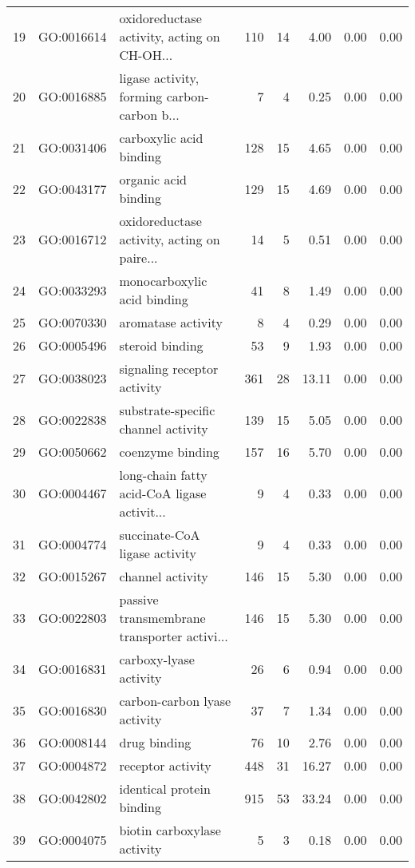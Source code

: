 \begin{table}[ht]
\begin{tabular}{rllrrrrr}
  19 & GO:0016614 & oxidoreductase activity, acting on CH-OH... & 110 &  14 & 4.00 & 0.00 & 0.00 \\ 
  20 & GO:0016885 & ligase activity, forming carbon-carbon b... &   7 &   4 & 0.25 & 0.00 & 0.00 \\ 
  21 & GO:0031406 & carboxylic acid binding & 128 &  15 & 4.65 & 0.00 & 0.00 \\ 
  22 & GO:0043177 & organic acid binding & 129 &  15 & 4.69 & 0.00 & 0.00 \\ 
  23 & GO:0016712 & oxidoreductase activity, acting on paire... &  14 &   5 & 0.51 & 0.00 & 0.00 \\ 
  24 & GO:0033293 & monocarboxylic acid binding &  41 &   8 & 1.49 & 0.00 & 0.00 \\ 
  25 & GO:0070330 & aromatase activity &   8 &   4 & 0.29 & 0.00 & 0.00 \\ 
  26 & GO:0005496 & steroid binding &  53 &   9 & 1.93 & 0.00 & 0.00 \\ 
  27 & GO:0038023 & signaling receptor activity & 361 &  28 & 13.11 & 0.00 & 0.00 \\ 
  28 & GO:0022838 & substrate-specific channel activity & 139 &  15 & 5.05 & 0.00 & 0.00 \\ 
  29 & GO:0050662 & coenzyme binding & 157 &  16 & 5.70 & 0.00 & 0.00 \\ 
  30 & GO:0004467 & long-chain fatty acid-CoA ligase activit... &   9 &   4 & 0.33 & 0.00 & 0.00 \\ 
  31 & GO:0004774 & succinate-CoA ligase activity &   9 &   4 & 0.33 & 0.00 & 0.00 \\ 
  32 & GO:0015267 & channel activity & 146 &  15 & 5.30 & 0.00 & 0.00 \\ 
  33 & GO:0022803 & passive transmembrane transporter activi... & 146 &  15 & 5.30 & 0.00 & 0.00 \\ 
  34 & GO:0016831 & carboxy-lyase activity &  26 &   6 & 0.94 & 0.00 & 0.00 \\ 
  35 & GO:0016830 & carbon-carbon lyase activity &  37 &   7 & 1.34 & 0.00 & 0.00 \\ 
  36 & GO:0008144 & drug binding &  76 &  10 & 2.76 & 0.00 & 0.00 \\ 
  37 & GO:0004872 & receptor activity & 448 &  31 & 16.27 & 0.00 & 0.00 \\ 
  38 & GO:0042802 & identical protein binding & 915 &  53 & 33.24 & 0.00 & 0.00 \\ 
  39 & GO:0004075 & biotin carboxylase activity &   5 &   3 & 0.18 & 0.00 & 0.00 \\ 

\end{tabular}
\end{table}
